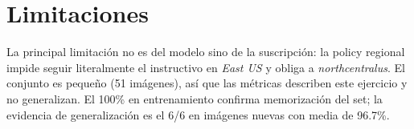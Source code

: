 \documentclass[a4paper,12pt]{article}
\begin{document}
  \section{Limitaciones}

  La principal limitaci\'on no es del modelo sino de la suscripci\'on: la policy regional impide seguir literalmente el instructivo en \textit{East US} y obliga a \textit{northcentralus}. El conjunto es peque\~no (51 im\'agenes), as\'i que las m\'etricas describen este ejercicio y no generalizan. El 100\% en entrenamiento confirma memorizaci\'on del set; la evidencia de generalizaci\'on es el 6/6 en im\'agenes nuevas con media de 96.7\%.

  
  
\end{document}
